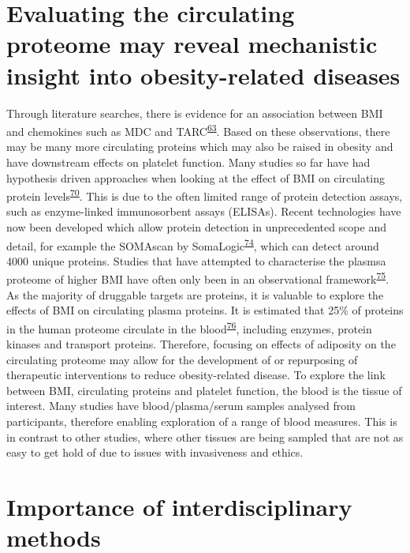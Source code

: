 \documentclass[11pt,twoside]{bristolthesis}
\begin{document}
\hypertarget{evaluating-the-circulating-proteome-may-reveal-mechanistic-insight-into-obesity-related-diseases}{%
\section{Evaluating the circulating proteome may reveal mechanistic insight into obesity-related diseases}\label{evaluating-the-circulating-proteome-may-reveal-mechanistic-insight-into-obesity-related-diseases}}

Through literature searches, there is evidence for an association between BMI and chemokines such as MDC and TARC\textsuperscript{\protect\hyperlink{ref-Kitahara2014}{63}}. Based on these observations, there may be many more circulating proteins which may also be raised in obesity and have downstream effects on platelet function. Many studies so far have had hypothesis driven approaches when looking at the effect of BMI on circulating protein levels\textsuperscript{\protect\hyperlink{ref-Timpson2011}{70}}. This is due to the often limited range of protein detection assays, such as enzyme-linked immunosorbent assays (ELISAs). Recent technologies have now been developed which allow protein detection in unprecedented scope and detail, for example the SOMAscan by SomaLogic\textsuperscript{\protect\hyperlink{ref-Gold2012}{74}}, which can detect around 4000 unique proteins. Studies that have attempted to characterise the plasmsa proteome of higher BMI have often only been in an observational framework\textsuperscript{\protect\hyperlink{ref-Cominetti2018}{75}}. As the majority of druggable targets are proteins, it is valuable to explore the effects of BMI on circulating plasma proteins. It is estimated that 25\% of proteins in the human proteome circulate in the blood\textsuperscript{\protect\hyperlink{ref-Imming2006}{76}}, including enzymes, protein kinases and transport proteins. Therefore, focusing on effects of adiposity on the circulating proteome may allow for the development of or repurposing of therapeutic interventions to reduce obesity-related disease. To explore the link between BMI, circulating proteins and platelet function, the blood is the tissue of interest. Many studies have blood/plasma/serum samples analysed from participants, therefore enabling exploration of a range of blood measures. This is in contrast to other studies, where other tissues are being sampled that are not as easy to get hold of due to issues with invasiveness and ethics.

\hypertarget{importance-of-interdisciplinary-methods}{%
\section{Importance of interdisciplinary methods}\label{importance-of-interdisciplinary-methods}}
\end{document}
